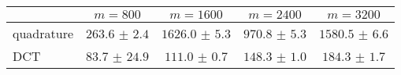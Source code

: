 \centering
\renewcommand{\arraystretch}{1.2}
\begin{tabular}{@{}lcccc@{}}
\toprule
 & $m=800$ & $m=1600$ & $m=2400$ & $m=3200$\\
\midrule
quadrature & $263.6$ $\pm$ $2.4$ & $1626.0$ $\pm$ $5.3$ & $970.8$ $\pm$ $5.3$ & $1580.5$ $\pm$ $6.6$ \\
DCT & $83.7$ $\pm$ $24.9$ & $111.0$ $\pm$ $0.7$ & $148.3$ $\pm$ $1.0$ & $184.3$ $\pm$ $1.7$ \\
\bottomrule
\end{tabular}
